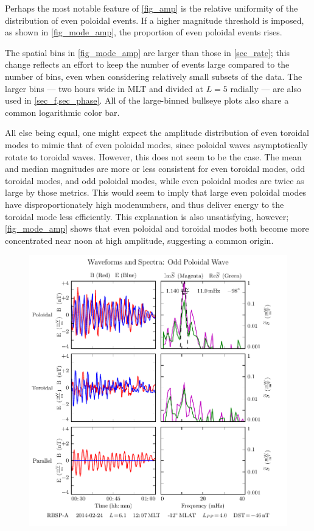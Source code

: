 Perhaps the most notable feature of \cref{fig_amp} is the relative uniformity of the distribution of even poloidal events. If a higher magnitude threshold is imposed, as shown in \cref{fig_mode_amp}, the proportion of even poloidal events rises. 

The spatial bins in \cref{fig_mode_amp} are larger than those in \cref{sec_rate}; this change reflects an effort to keep the number of events large compared to the number of bins, even when considering relatively small subsets of the data. The larger bins --- two hours wide in MLT and divided at $L = 5$ radially --- are also used in \cref{sec_f,sec_phase}. All of the large-binned bullseye plots also share a common logarithmic color bar. 

All else being equal, one might expect the amplitude distribution of even toroidal modes to mimic that of even poloidal modes, since poloidal waves asymptotically rotate to toroidal waves. However, this does not seem to be the case. The mean and median magnitudes are more or less consistent for even toroidal modes, odd toroidal modes, and odd poloidal modes, while even poloidal modes are twice as large by those metrics. This would seem to imply that large even poloidal modes have disproportionately high modenumbers, and thus deliver energy to the toroidal mode less efficiently. This explanation is also unsatisfying, however; \cref{fig_mode_amp} shows that even poloidal and toroidal modes both become more concentrated near noon at high amplitude, suggesting a common origin. 

\begin{figure}[!htb]
    \centering
    \includegraphics[width=\textwidth]{figures/sample_event_strong.pdf}
    \caption[Waveforms and Spectra for a Strong Pc4 Event]{
      \todo{$\cdots$}
    }
    \label{fig_sample_event_strong}
\end{figure}

